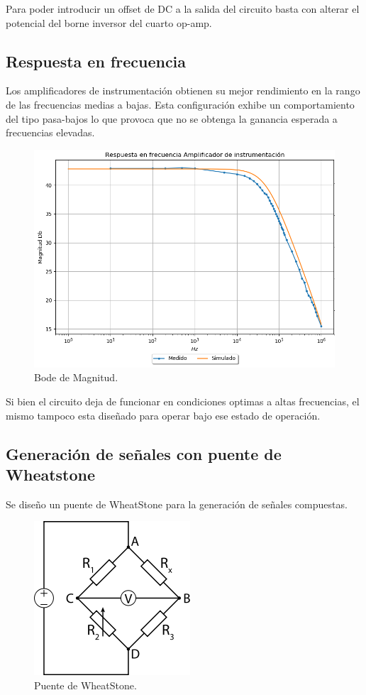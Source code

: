 Para poder introducir un offset de DC a la salida del circuito basta con alterar el potencial del borne inversor del cuarto op-amp.


\subsection{Respuesta en frecuencia}
Los amplificadores de instrumentación obtienen su mejor rendimiento en la rango de las frecuencias medias a bajas. Esta configuración exhibe un comportamiento del tipo pasa-bajos lo que provoca que no se obtenga la ganancia esperada a frecuencias elevadas.
\begin{figure}[H]
	\centering
	\includegraphics[height=0.3\textheight]{./ImagenesVarias/BODE_MAG.PNG}
	\caption{Bode de Magnitud.}
\end{figure}

Si bien el circuito deja de funcionar en condiciones optimas a altas frecuencias, el mismo tampoco esta diseñado para operar bajo ese estado de operación.
 
\subsection{Generación de señales con puente de Wheatstone}
Se diseño un puente de WheatStone para la generación de señales compuestas.
\begin{figure}[H]
	\centering
	\includegraphics[height=0.25\textheight]{./ImagenesVarias/wheatstone.png}
	\caption{Puente de WheatStone.}
\end{figure}


